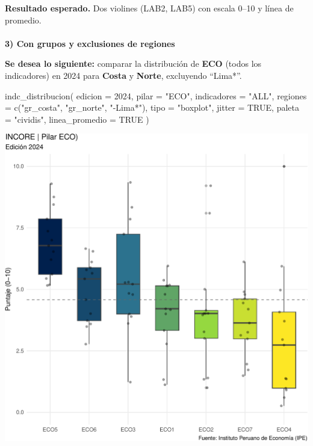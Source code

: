 \documentclass[
  11pt,
  letterpaper,
  DIV=11,
  numbers=noendperiod]{scrartcl}
\makeatletter
\let\oldparagraph\paragraph
\renewcommand{\paragraph}{
    \@ifstar
      \xxxParagraphStar
      \xxxParagraphNoStar
  }
\newcommand{\xxxParagraphStar}[1]{\oldparagraph*{#1}\mbox{}}
\newcommand{\xxxParagraphNoStar}[1]{\oldparagraph{#1}\mbox{}}
\newenvironment{Shaded}{\begin{snugshade}}{\end{snugshade}}
\newcommand{\AttributeTok}[1]{\textcolor[rgb]{0.40,0.45,0.13}{#1}}
\newcommand{\ConstantTok}[1]{\textcolor[rgb]{0.56,0.35,0.01}{#1}}
\newcommand{\DecValTok}[1]{\textcolor[rgb]{0.68,0.00,0.00}{#1}}
\newcommand{\FunctionTok}[1]{\textcolor[rgb]{0.28,0.35,0.67}{#1}}
\newcommand{\NormalTok}[1]{\textcolor[rgb]{0.00,0.23,0.31}{#1}}
\newcommand{\StringTok}[1]{\textcolor[rgb]{0.13,0.47,0.30}{#1}}
\makeatother
\begin{document}
\textbf{Resultado esperado.} Dos violines (LAB2, LAB5) con escala 0--10
y línea de promedio.

\paragraph{\texorpdfstring{\textbf{3) Con grupos y exclusiones de
regiones}}{3) Con grupos y exclusiones de regiones}}\label{con-grupos-y-exclusiones-de-regiones}

\textbf{Se desea lo siguiente:} comparar la distribución de \textbf{ECO}
(todos los indicadores) en 2024 para \textbf{Costa} y \textbf{Norte},
excluyendo ``Lima*''.

\begin{Shaded}
\begin{Highlighting}[]
\FunctionTok{indc\_distribucion}\NormalTok{(}
  \AttributeTok{edicion         =} \DecValTok{2024}\NormalTok{,}
  \AttributeTok{pilar           =} \StringTok{"ECO"}\NormalTok{,}
  \AttributeTok{indicadores     =} \StringTok{"ALL"}\NormalTok{,}
  \AttributeTok{regiones        =} \FunctionTok{c}\NormalTok{(}\StringTok{"gr\_costa"}\NormalTok{, }\StringTok{"gr\_norte"}\NormalTok{, }\StringTok{"{-}Lima*"}\NormalTok{),}
  \AttributeTok{tipo            =} \StringTok{"boxplot"}\NormalTok{,}
  \AttributeTok{jitter          =} \ConstantTok{TRUE}\NormalTok{,}
  \AttributeTok{paleta          =} \StringTok{"cividis"}\NormalTok{,}
  \AttributeTok{linea\_promedio  =} \ConstantTok{TRUE}
\NormalTok{)}
\end{Highlighting}
\end{Shaded}

\includegraphics{Manual_files/figure-pdf/unnamed-chunk-93-1.pdf}
\end{document}
